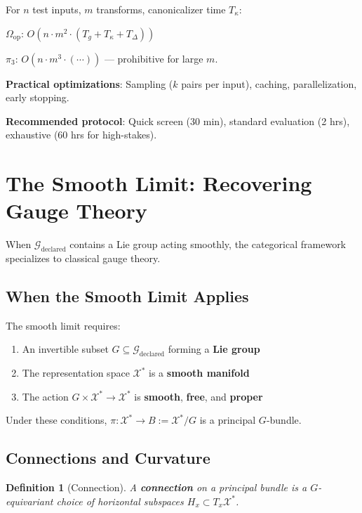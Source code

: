 \documentclass[12pt]{article}
\newtheorem{definition}[theorem]{Definition}
\begin{document}
For $n$ test inputs, $m$ transforms, canonicalizer time $T_\kappa$:

$\Omega_{\mathrm{op}}$: $O(n \cdot m^2 \cdot (T_g + T_\kappa + T_\Delta))$

$\pi_3$: $O(n \cdot m^3 \cdot (\cdots))$ --- prohibitive for large $m$.

\textbf{Practical optimizations}: Sampling ($k$ pairs per input), caching, parallelization, early stopping.

\textbf{Recommended protocol}: Quick screen (30 min), standard evaluation (2 hrs), exhaustive (60 hrs for high-stakes).

\section{The Smooth Limit: Recovering Gauge Theory}
\label{sec:smooth-limit}

When $\mathcal{G}_{\mathrm{declared}}$ contains a Lie group acting smoothly, the categorical framework specializes to classical gauge theory.

\subsection{When the Smooth Limit Applies}

The smooth limit requires:
\begin{enumerate}
    \item An invertible subset $G \subseteq \mathcal{G}_{\mathrm{declared}}$ forming a \textbf{Lie group}
    \item The representation space $\mathcal{X}^*$ is a \textbf{smooth manifold}
    \item The action $G \times \mathcal{X}^* \to \mathcal{X}^*$ is \textbf{smooth}, \textbf{free}, and \textbf{proper}
\end{enumerate}

Under these conditions, $\pi\colon \mathcal{X}^* \to B := \mathcal{X}^*/G$ is a principal $G$-bundle.

\subsection{Connections and Curvature}

\begin{definition}[Connection]
\emph{A \textbf{connection} on a principal bundle is a $G$-equivariant choice of horizontal subspaces $H_x \subset T_x \mathcal{X}^*$.}
\end{definition}
\end{document}

